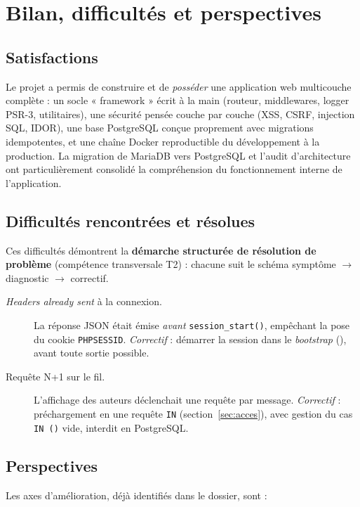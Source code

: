 \chapter{Bilan, difficultés et perspectives}
\label{ch:bilan}

\section{Satisfactions}

Le projet a permis de construire et de \emph{posséder} une application web multicouche complète :
un socle « framework » écrit à la main (routeur, middlewares, logger PSR-3, utilitaires), une
sécurité pensée couche par couche (XSS, CSRF, injection SQL, IDOR), une base PostgreSQL conçue
proprement avec migrations idempotentes, et une chaîne Docker reproductible du développement à la
production. La migration de MariaDB vers PostgreSQL et l'audit d'architecture ont particulièrement
consolidé la compréhension du fonctionnement interne de l'application.

\section{Difficultés rencontrées et résolues}

Ces difficultés démontrent la \textbf{démarche structurée de résolution de problème} (compétence
transversale T2) : chacune suit le schéma symptôme $\to$ diagnostic $\to$ correctif.

\begin{description}
  \item[\emph{Headers already sent} à la connexion.] La réponse JSON était émise \emph{avant}
        \texttt{session\_start()}, empêchant la pose du cookie \texttt{PHPSESSID}.
        \emph{Correctif} : démarrer la session dans le \emph{bootstrap}
        (), avant toute sortie possible.
  \item[Requête N+1 sur le fil.] L'affichage des auteurs déclenchait une requête par message.
        \emph{Correctif} : préchargement en une requête \texttt{IN} (section~\ref{sec:acces}),
        avec gestion du cas \texttt{IN ()} vide, interdit en PostgreSQL.
\end{description}

\section{Perspectives}

Les axes d'amélioration, déjà identifiés dans le dossier, sont :

